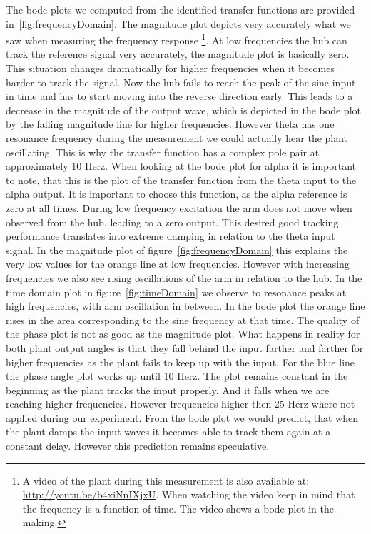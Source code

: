\documentclass[ twoside,openright,titlepage,numbers=noenddot,headinclude,%
                footinclude=true,cleardoublepage=empty,abstractoff, %
                BCOR=5mm,paper=a4,fontsize=11pt,%
                ngerman,american,%
                ]{scrreprt}
\begin{document}
The bode plots we computed from the identified transfer functions are provided in~\ref{fig:frequencyDomain}. The magnitude plot depicts very accurately what we saw when measuring the frequency response \footnote{A video of the plant during this measurement is also available at: \url{http://youtu.be/b4xiNnIXjxU}. When watching the video keep in mind that the frequency is a function of time. The video shows a bode plot in the making.}. At low frequencies the hub can track the reference signal very accurately, the magnitude plot is basically zero. This situation changes dramatically for higher frequencies when it becomes harder to track the signal. Now the hub fails to reach the peak of the sine input in time and has to start moving into the reverse direction early. This leads to a decrease in the magnitude of the output wave, which is depicted in the bode plot by the falling magnitude line for  higher frequencies. However theta has one resonance frequency during the measurement we could actually hear the plant oscillating. This is why the transfer function has a complex pole pair at approximately 10 Herz. 
When looking at the bode plot for alpha it is important to note, that this is the plot of the transfer function from the theta input to the alpha output. It is important to choose this function, as the alpha reference is zero at all times. During low frequency excitation the arm does not move when observed from the hub, leading to a zero output. This desired good tracking performance translates into extreme damping in relation to the theta input signal. In the magnitude plot of figure~\ref{fig:frequencyDomain} this explains the very low values for the orange line at low frequencies. However with increasing frequencies we also see rising oscillations of the arm in relation to the hub. In the time domain plot in figure~\ref{fig:timeDomain} we observe to resonance peaks at high frequencies, with arm oscillation in between. In the bode plot the orange line rises in the area corresponding to the sine frequency at that time. 
The quality of the phase plot is not as good as the magnitude plot. What happens in reality for both plant output angles is that they fall behind the input farther and farther for higher frequencies as the plant fails to keep up with the input. For the blue line the phase angle plot works up until 10 Herz. The plot remains constant in the beginning as the plant tracks the input properly. And it falls when we are reaching higher frequencies. However frequencies higher then 25 Herz where not applied during our experiment. From the bode plot we would predict, that when the plant damps the input waves it becomes able to track them again at a constant delay. However this prediction remains speculative.   
\end{document}
